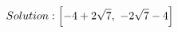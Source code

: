 \documentclass[preview]{standalone}
\begin{document}
\begin{align*}
\special{dvisvgm:raw <g id='unique000'>}Solution: \left[ -4 + 2 \sqrt{7}, \  - 2 \sqrt{7} - 4\right]\special{dvisvgm:raw </g>}
\end{align*}
\end{document}
